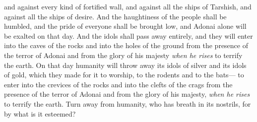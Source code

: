 \begin{biblechapter}
and against every kind of fortified wall,
\verse and against all the ships of Tarshish, 
and against all the ships of desire.
\verse And the haughtiness of the people shall be humbled, 
and the pride of everyone shall be brought low, 
and Adonai alone will be exalted on that day.
\verse And the idols shall pass away entirely,
\verse and they will enter into the caves of the rocks 
and into the holes of the ground 
from the presence of the terror of Adonai 
and from the glory of his majesty 
\textit{when he rises} to terrify the earth.
\verse On that day humanity will throw away its idols of silver 
and its idols of gold, 
which they made for it to worship, 
to the rodents and to the bats—
\verse to enter into the crevices of the rocks 
and into the clefts of the crags 
from the presence of the terror of Adonai 
and from the glory of his majesty, 
\textit{when he rises} to terrify the earth.
\verse Turn away from humanity, 
who has breath in its nostrils, 
for by what is it esteemed?
\end{biblechapter}

